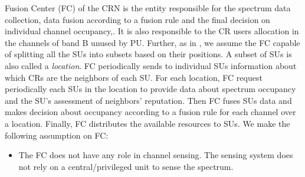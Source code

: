 \documentclass[letterpaper, 10 pt, conference]{ieeeconf}  %
\begin{document}
Fusion Center (FC) of the CRN is the entity responsible for the spectrum data collection, data fusion according to a fusion rule and the final decision on individual channel occupancy\cite{hyder},\cite{rawat}\cite{ma}. It is also responsible to the CR users allocation in the channels of band B unused by PU. Further, as in \cite{qingao}, we assume the FC capable of splitting all the SUs into subsets based on their positions. A subset of SUs is also called a \textit{location}. FC periodically sends to individual SUs information about which CRs are the neighbors of each SU. For each location, FC request periodically each SUs in the location to provide data about spectrum occupancy and the SU's assessment of neighbors' reputation.
%
Then FC fuses SUs data and makes decision about occupancy according to a fusion rule for each channel over a location. Finally, FC distributes the available resources to SUs. We make the following assumption on FC:
\begin{itemize}
\item {The FC does not have any role in channel sensing. The sensing system does not rely on a central/privileged unit to sense the spectrum.}
\end{itemize}
\end{document}
